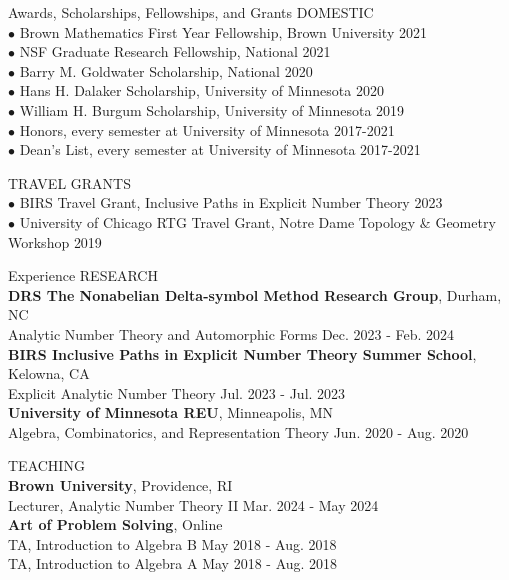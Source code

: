 \documentclass{resume} %
\begin{document}
\begin{rSection}{Awards, Scholarships, Fellowships, and Grants}
DOMESTIC \\
{$\bullet$ Brown Mathematics First Year Fellowship, Brown University} \hfill {2021} \\
{$\bullet$ NSF Graduate Research Fellowship, National} \hfill {2021} \\
{$\bullet$ Barry M. Goldwater Scholarship, National} \hfill {2020} \\
{$\bullet$ Hans H. Dalaker Scholarship, University of Minnesota} \hfill {2020} \\
{$\bullet$ William H. Burgum Scholarship, University of Minnesota} \hfill {2019} \\
{$\bullet$ Honors, every semester at University of Minnesota} \hfill {2017-2021} \\
{$\bullet$ Dean's List, every semester at University of Minnesota} \hfill {2017-2021}

TRAVEL GRANTS \\
{$\bullet$ BIRS Travel Grant, Inclusive Paths in Explicit Number Theory} \hfill {2023} \\
{$\bullet$ University of Chicago RTG Travel Grant, Notre Dame Topology \& Geometry Workshop} \hfill {2019} 
\end{rSection}

\begin{rSection}{Experience}
RESEARCH \\
{\bf DRS The Nonabelian Delta-symbol Method Research Group}, Durham, NC \\
\hphantom{\quad} Analytic Number Theory and Automorphic Forms \hfill {Dec. 2023 - Feb. 2024} \\
{\bf BIRS Inclusive Paths in Explicit Number Theory Summer School}, Kelowna, CA \\
\hphantom{\quad} Explicit Analytic Number Theory \hfill {Jul. 2023 - Jul. 2023} \\
{\bf University of Minnesota REU}, Minneapolis, MN \\
\hphantom{\quad} Algebra, Combinatorics, and Representation Theory \hfill {Jun. 2020 - Aug. 2020}

TEACHING \\
{\bf Brown University}, Providence, RI \\
\hphantom{\quad} Lecturer, Analytic Number Theory II \hfill {Mar. 2024 - May 2024} \\
{\bf Art of Problem Solving}, Online \\
\hphantom{\quad} TA, Introduction to Algebra B \hfill {May 2018 - Aug. 2018} \\
\hphantom{\quad} TA, Introduction to Algebra A \hfill {May 2018 - Aug. 2018} \\
\end{rSection}
\end{document}
